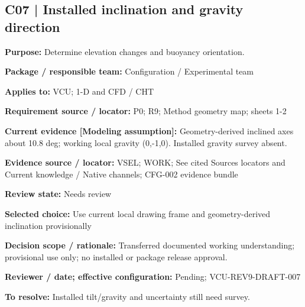 \documentclass[11pt]{article}
\begin{document}
\par\noindent\begin{minipage}{\textwidth}\small\setlength{\parskip}{2pt}
\subsection*{C07 | Installed inclination and gravity direction}
\textbf{Purpose:} Determine elevation changes and buoyancy orientation.\par
\textbf{Package / responsible team:} Configuration / Experimental team\par
\textbf{Applies to:} VCU; 1-D and CFD / CHT\par
\textbf{Requirement source / locator:} P0; R9; Method geometry map; sheets 1-2\par
\textbf{Current evidence [Modeling assumption]:} Geometry-derived inclined axes about 10.8 deg; working local gravity (0,-1,0). Installed gravity survey absent.\par
\textbf{Evidence source / locator:} VSEL; WORK; See cited Sources locators and Current knowledge / Native channels; CFG-002 evidence bundle\par
\textbf{Review state:} Needs review\par
\textbf{Selected choice:} Use current local drawing frame and geometry-derived inclination provisionally\par
\textbf{Decision scope / rationale:} Transferred documented working understanding; provisional use only; no installed or package release approval.\par
\textbf{Reviewer / date; effective configuration:} Pending; VCU-REV9-DRAFT-007\par
\textbf{To resolve:} Installed tilt/gravity and uncertainty still need survey.\par
\end{minipage}\par\vspace{5pt}
\end{document}
